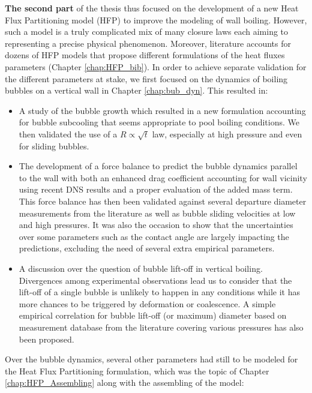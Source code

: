 \npar

\textbf{The second part} of the thesis thus focused on the development of a new Heat Flux Partitioning model (HFP) to improve the modeling of wall boiling. However, such a model is a truly complicated mix of many closure laws each aiming to representing a precise physical phenomenon. Moreover, literature accounts for dozens of HFP models that propose different formulations of the heat fluxes parameters (Chapter \ref{chap:HFP_bib}). In order to achieve separate validation for the different parameters at stake, we first focused on the dynamics of boiling bubbles on a vertical wall in Chapter \ref{chap:bub_dyn}. This resulted in:

\begin{itemize}
\item A study of the bubble growth which resulted in a new formulation accounting for bubble subcooling that seems appropriate to pool boiling conditions. We then validated the use of a $R \propto \sqrt{t}$ law, especially at high pressure and even for sliding bubbles.

\item The development of a force balance to predict the bubble dynamics parallel to the wall with both an enhanced drag coefficient accounting for wall vicinity using recent DNS results \cite{shi_drag_2021} and a proper evaluation of the added mass term. This force balance has then been validated against several departure diameter measurements from the literature as well as bubble sliding velocities at low and high pressures. It was also the occasion to show that the uncertainties over some parameters such as the contact angle are largely impacting the predictions, excluding the need of several extra empirical parameters.

\item A discussion over the question of bubble lift-off in vertical boiling. Divergences among experimental observations lead us to consider that the lift-off of a single bubble is unlikely to happen in any conditions while it has more chances to be triggered by deformation or coalescence. A simple empirical correlation for bubble lift-off (or maximum) diameter based on measurement database from the literature covering various pressures has also been proposed.
\end{itemize}

Over the bubble dynamics, several other parameters had still to be modeled for the Heat Flux Partitioning formulation, which was the topic of Chapter \ref{chap:HFP_Assembling} along with the assembling of the model:

